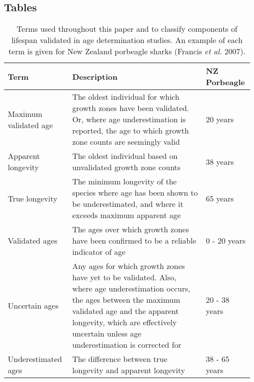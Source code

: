 \documentclass[]{article}
\title{}
\author{}
\date{}
\begin{document}
\subsection{Tables}\label{tables}

\begin{table}[ht]
\centering
\caption{Terms used throughout this paper and to classify components of lifespan validated in age determination studies. An example of each term is given for New Zealand porbeagle sharks (Francis \emph{et al.} 2007).\newline} 
\begin{tabular}{p{4cm}p{9cm}p{2.5cm}}
  \toprule
Term & Description & NZ Porbeagle \\ 
  \midrule
Maximum validated age & The oldest individual for which growth zones have been validated. Or, where age underestimation is reported, the age to which growth zone counts are seemingly valid & 20 years \\ 
  Apparent longevity & The oldest individual based on unvalidated growth zone counts & 38 years \\ 
  True longevity & The minimum longevity of the species where age has been shown to be underestimated, and where it exceeds maximum apparent age & 65 years \\ 
  Validated ages & The ages over which growth zones have been confirmed to be a reliable indicator of age & 0 - 20 years \\ 
  Uncertain ages & Any ages for which growth zones have yet to be validated. Also, where age underestimation occurs, the ages between the maximum validated age and the apparent longevity, which are effectively uncertain unless age underestimation is corrected for & 20 - 38 years \\ 
  Underestimated ages & The difference between true longevity and apparent longevity & 38 - 65 years \\ 
   \bottomrule
\end{tabular}
\end{table}

\newpage
\end{document}

